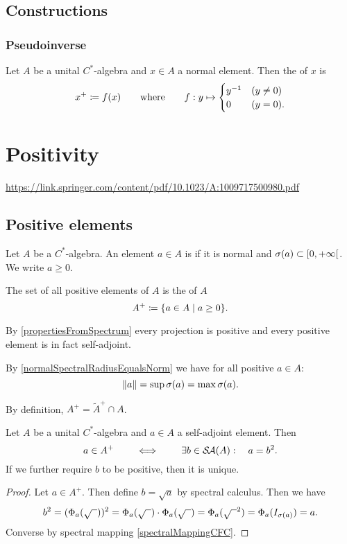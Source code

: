 \subsection{Constructions}
\subsubsection{Pseudoinverse}
\begin{definition}
Let $A$ be a unital $C^*$-algebra and $x\in A$ a normal element. Then the  of $x$ is 
\[ x^+ \coloneqq f(x) \qquad\text{where}\qquad f: y \mapsto \begin{cases}
y^{-1} & (y \neq 0) \\ 0 & (y = 0).
\end{cases} \]
\end{definition}

\section{Positivity}
\url{https://link.springer.com/content/pdf/10.1023/A:1009717500980.pdf}
\subsection{Positive elements}
\begin{definition}
Let $A$ be a $C^*$-algebra. An element $a\in A$ is  if it is normal and $\sigma(a) \subset \interval[co]{0,+\infty}$. We write $a\geq 0$.

The set of all positive elements of $A$ is the  of $A$
\[ A^+ \defeq \setbuilder{a\in A}{a\geq 0}. \]
\end{definition}
By \ref{propertiesFromSpectrum} every projection is positive and every positive element is in fact self-adjoint.

By \ref{normalSpectralRadiusEqualsNorm} we have for all positive $a\in A$:
\[ \lVert a\rVert = \sup\sigma(a) = \max\sigma(a). \]

By definition, $A^+ = \widetilde{A}^+ \cap A$.

\begin{proposition}
Let $A$ be a unital $C^*$-algebra and $a\in A$ a self-adjoint element. Then
\[ a\in A^+ \qquad\iff\qquad \exists b\in \mathop{\mathcal{S}\hspace{-0.15em}\mathcal{A}}\nolimits(A):\quad a = b^2. \]
If we further require $b$ to be positive, then it is unique.
\end{proposition}
\begin{proof}
Let $a\in A^+$. Then define $b = \sqrt{a}$ by spectral calculus. Then we have
\[ b^2 = (\Phi_a(\sqrt{\mbox{\;\;}}))^2 = \Phi_a(\sqrt{\mbox{\;\;}})\cdot \Phi_a(\sqrt{\mbox{\;\;}}) = \Phi_a(\sqrt{\mbox{\;\;}}^2) = \Phi_a(I_{\sigma(a)}) = a. \]
Converse by spectral mapping \ref{spectralMappingCFC}.
\end{proof}

